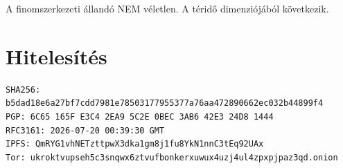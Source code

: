 \documentclass[12pt,a4paper]{article}
\begin{document}
A finomszerkezeti állandó NEM véletlen. A téridő dimenziójából következik.

\section{Hitelesítés}

\begin{verbatim}
SHA256: b5dad18e6a27bf7cdd7981e78503177955377a76aa472890662ec032b44899f4
PGP: 6C65 165F E3C4 2EA9 5C2E 0BEC 3AB6 42E3 24D8 1444
RFC3161: 2026-07-20 00:39:30 GMT
IPFS: QmRYG1vhNETzttpwX3dka1gm8j1fu8YkN1nnC3tEq92UAx
Tor: ukroktvupseh5c3snqwx6ztvufbonkerxuwux4uzj4ul4zpxpjpaz3qd.onion
\end{verbatim}
\end{document}
